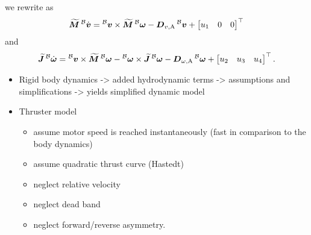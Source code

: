 we rewrite  as
\begin{equation}
	\label{eq:eom-translational-with-input}
	\Mbs \vlinbodydot =
	\vlinbody \times \Mbs \vangbody
	-\Dvadded \vlinbody
	+
	\begin{bmatrix}
		u_1 & 0 & 0
	\end{bmatrix}^\top
\end{equation}
and
\begin{equation}
	\label{eq:eom-rotational-with-input}
	\Jbs \vangbodydot =
	\vlinbody \times \Mbs \vangbody
	- \vangbody \times \Jbs \vangbody
	- \Domegaadded \vangbody
	+
	\begin{bmatrix}
		u_2 & u_3 & u_4
	\end{bmatrix}^\top
	.
\end{equation}

\begin{itemize}
	\color{red}
	\item Rigid body dynamics -> added hydrodynamic terms -> assumptions and simplifications -> yields simplified dynamic model
	\item Thruster model
	\begin{itemize}
		\item assume motor speed is reached instantaneously (fast in comparison to the body dynamics)
		\item assume quadratic thrust curve (Hastedt)
		\item neglect relative velocity
		\item neglect dead band
		\item neglect forward/reverse asymmetry.
	\end{itemize}
\end{itemize}





